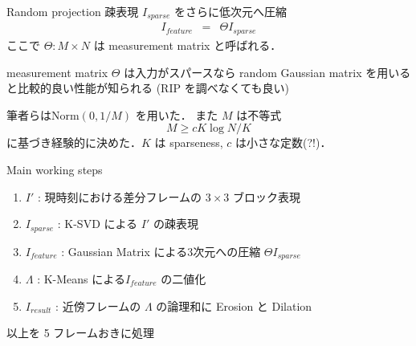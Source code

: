 \begin{frame}{Random projection}
疎表現 $I_{sparse}$ をさらに低次元へ圧縮
\begin{eqnarray}
    I_{feature} & = & \Theta I_{sparse}
\end{eqnarray}
ここで $\Theta : M \times N$ は measurement matrix と呼ばれる．
\begin{block}{measurement matrix}
$\Theta$ は入力がスパースなら random Gaussian matrix を用いると比較的良い性能が知られる (RIP を調べなくても良い)\cite{Candes2006}
\end{block}
筆者らは$\mathrm{Norm}(0, 1/M)$ を用いた．
また $M$ は不等式
\begin{equation}
    M \geq c K \log{N/K}
\end{equation}
に基づき経験的に決めた．$K$ は sparseness, $c$ は小さな定数(?!)．
\end{frame}


\begin{frame}{Main working steps}
\begin{enumerate}
    \item $I'$ : 現時刻における差分フレームの $3\times3$ ブロック表現
    \item $I_{sparse}$ : K-SVD による $I'$ の疎表現
    \item $I_{feature}$ : Gaussian Matrix による3次元への圧縮 $\Theta I_{sparse}$
    \item $\Lambda$ : K-Means による$I_{feature}$ の二値化
    \item $I_{result}$ : 近傍フレームの $\Lambda$ の論理和に Erosion と Dilation
\end{enumerate}
以上を 5 フレームおきに処理
\end{frame}

